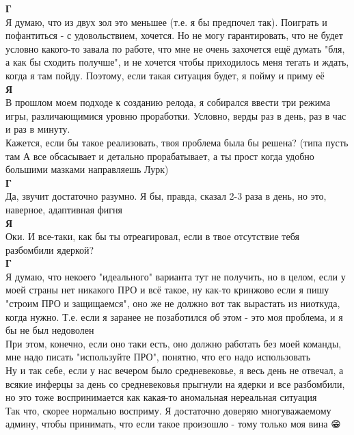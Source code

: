 \textbf{Г} \\
Я думаю, что из двух зол это меньшее (т.е. я бы предпочел так). Поиграть и пофантиться - с удовольствием, хочется. Но не могу гарантировать, что не будет условно какого-то завала по работе, что мне не очень захочется ещё думать "бля, а как бы сходить получше", и не хочется чтобы приходилось меня тегать и ждать, когда я там пойду. Поэтому, если такая ситуация будет, я пойму и приму её\\

\textbf{Я} \\
В прошлом моем подходе к созданию релода, я собирался ввести три режима игры, различающимися уровню проработки. Условно, верды раз в день, раз в час и раз в минуту.\\
Кажется, если бы такое реализовать, твоя проблема была бы решена? (типа пусть там А все обсасывает и детально прорабатывает, а ты прост когда удобно большими мазками направляешь Лурк)\\

\textbf{Г} \\
Да, звучит достаточно разумно. Я бы, правда, сказал 2-3 раза в день, но это, наверное, адаптивная фигня\\

\textbf{Я} \\
Оки. И все-таки, как бы ты отреагировал, если в твое отсутствие тебя разбомбили ядеркой?\\

\textbf{Г} \\
Я думаю, что некоего "идеального" варианта тут не получить, но в целом, если у моей страны нет никакого ПРО и всё такое, ну как-то кринжово если я пишу "строим ПРО и защищаемся", оно же не должно вот так вырастать из ниоткуда, когда нужно. Т.е. если я заранее не позаботился об этом - это моя проблема, и я бы не был недоволен\\

При этом, конечно, если оно таки есть, оно должно работать без моей команды, мне надо писать "используйте ПРО", понятно, что его надо использовать\\

Ну и так себе, если у нас вечером было средневековье, я весь день не отвечал, а всякие инферцы за день со средневековья прыгнули на ядерки и все разбомбили, но это тоже воспринимается как какая-то аномальная нереальная ситуация\\

Так что, скорее нормально восприму. Я достаточно доверяю многуважаемому админу, чтобы принимать, что если такое произошло - тому только моя вина 😁🙏

